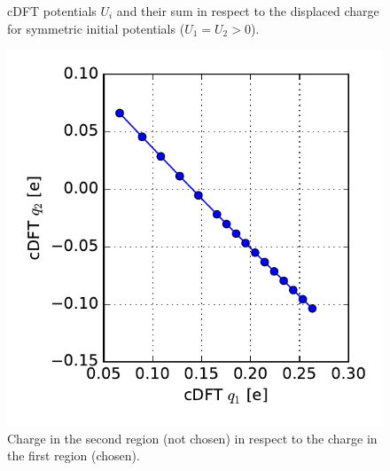 \begin{figure}
\begin{minipage}{0.49\textwidth}
				\caption{cDFT potentials $U_i$ and their sum in respect to the displaced charge for symmetric initial potentials \mbox{($U_1 = U_2 > 0$)}.}
				\label{image_potential_asymmetrys}
	
		\end{minipage}
\end{figure}
\begin{figure}
	\centering
	\begin{minipage}{0.49\textwidth}
		\centering
			\includegraphics[width = \textwidth]{Images/Hydrogen/charging/charge_correlation}
			\caption{Charge in the second region (not chosen) in respect to the charge in the first region (chosen).}
			\label{image_charge_correlation}
	

\end{minipage}
\end{figure}

